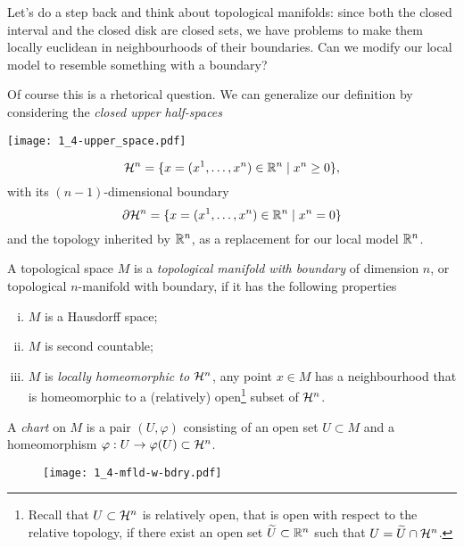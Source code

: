 Let's do a step back and think about topological manifolds: since both the closed interval and the closed disk are closed sets, we have problems to make them locally euclidean in neighbourhoods of their boundaries.
Can we modify our local model to resemble something with a boundary?

Of course this is a rhetorical question.
We can generalize our definition by considering the \emph{closed upper half-spaces}
\begin{marginfigure}[2em]
  \texttt{[image: 1\_4-upper\_space.pdf]}
\end{marginfigure}
\begin{equation}
  \mathcal{H}^n = \{x=(x^1, \ldots, x^n)\in\mathbb{R}^n\mid x^n \geq 0\},
\end{equation}
with its $(n-1)$-dimensional boundary
\begin{equation}
  \partial\mathcal{H}^n = \{x=(x^1, \ldots, x^n)\in\mathbb{R}^n\mid x^n = 0\}
\end{equation}
and the topology inherited by $\mathbb{R}^n$, as a replacement for our local model $\mathbb{R}^n$.

\begin{definition}
  A topological space $M$ is a \emph{topological manifold with boundary} of dimension $n$, or topological $n$-manifold with boundary, if it has the following properties
  \begin{enumerate}[(i)]
    \item $M$ is a Hausdorff space;
    \item $M$ is second countable;
    \item $M$ is \emph{locally homeomorphic to $\mathcal{H}^n$}, any point $x\in M$ has a neighbourhood that is homeomorphic to a (relatively) open\footnote{Recall that $U\subset\mathcal{H}^n$ is relatively open, that is open with respect to the relative topology, if there exist an open set $\widetilde U\subset\mathbb{R}^n$ such that $U = \widetilde U \cap \mathcal{H}^n$.} subset of $\mathcal{H}^n$.
  \end{enumerate}

  A \emph{chart} on $M$ is a pair $(U, \varphi)$ consisting of an open set $U\subset M$ and a homeomorphism $\varphi: U \to \varphi(U)\subset \mathcal{H}^n$.
\end{definition}

\begin{figure}
  \texttt{[image: 1\_4-mfld-w-bdry.pdf]}
\end{figure}


